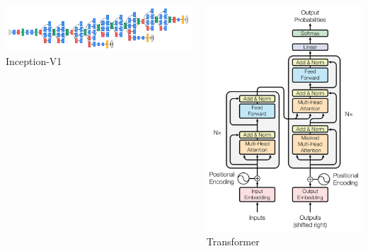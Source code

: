 \documentclass[usenames,dvipsnames]{beamer}
\begin{document}
\begin{frame}{\secname}{\subsecname}
\begin{columns}
\begin{column}{0.7\textwidth}
\begin{center}
                    \vspace{-0.8em} 
                    \includegraphics[width=\linewidth]{figures/Going_deeper/inception_v1.png}\\ \vspace{-0.8em} {\tiny Inception-V1}
                \end{center}
            \end{column}
            \begin{column}{0.3\textwidth}
                \begin{center}
                    \vspace{-1.8em} 
                    \includegraphics[width=\linewidth]{figures/Going_deeper/transformer.png}\\ \vspace{-0.8em} {\tiny Transformer}

\end{center}
\end{column}
\end{columns}
\end{frame}
\end{document}
